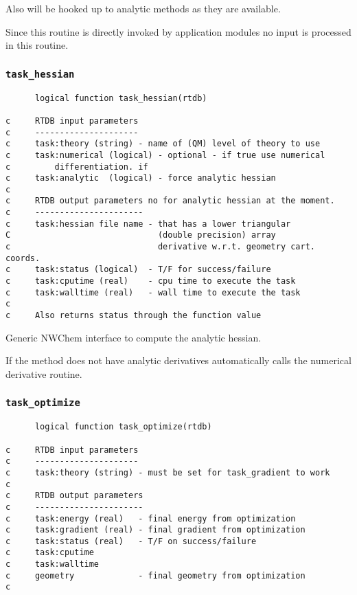 Also will be hooked up to analytic methods as they are available.

Since this routine is directly invoked by application modules
no input is processed in this routine.

\subsubsection{{\tt task\_hessian}}

\begin{verbatim}
      logical function task_hessian(rtdb)
 
c     RTDB input parameters
c     ---------------------
c     task:theory (string) - name of (QM) level of theory to use
c     task:numerical (logical) - optional - if true use numerical 
c         differentiation. if 
c     task:analytic  (logical) - force analytic hessian
c     
c     RTDB output parameters no for analytic hessian at the moment.
c     ----------------------
c     task:hessian file name - that has a lower triangular 
C                              (double precision) array 
c                              derivative w.r.t. geometry cart. coords.
c     task:status (logical)  - T/F for success/failure
c     task:cputime (real)    - cpu time to execute the task
c     task:walltime (real)   - wall time to execute the task
c
c     Also returns status through the function value
\end{verbatim}

Generic NWChem interface to compute the analytic hessian.  

If the method does not have analytic derivatives automatically calls
the numerical derivative routine.



\subsubsection{{\tt task\_optimize}}

\begin{verbatim}
      logical function task_optimize(rtdb)
     
c     RTDB input parameters
c     ---------------------
c     task:theory (string) - must be set for task_gradient to work
c     
c     RTDB output parameters
c     ----------------------
c     task:energy (real)   - final energy from optimization
c     task:gradient (real) - final gradient from optimization
c     task:status (real)   - T/F on success/failure
c     task:cputime
c     task:walltime
c     geometry             - final geometry from optimization
c     
\end{verbatim}

